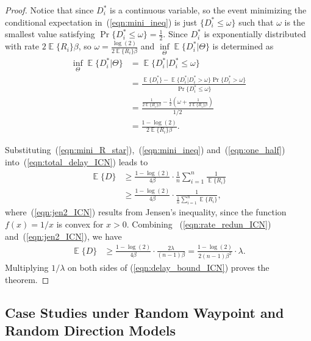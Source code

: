 \documentclass[twocolumn, 10pt]{svjour3}         \smartqed  \usepackage{graphicx}
\DeclareMathOperator*{\E}{\mathbb{E}}
\begin{document}
\begin{proof}
Notice that since $D_i^*$ is a continuous variable, so the event minimizing the conditional expectation in~(\ref{eqn:mini_ineq}) is just  $\{ D_i^* \leq \omega \}$ such that $\omega$ is the  smallest value satisfying  $\Pr\{ D_i^* \leq \omega \} = \frac{1}{2}$.
Since $D_i^*$  is exponentially distributed with rate $2 \E\{R_i\} \beta$, so  $\omega = \frac{\log (2)}{2 \E\{R_i\} \beta}$ and $\underset{\Theta}{\inf}  \E\{D_i^* | \Theta \}$ is determined as 
\begin{align}
	\underset{\Theta}{\inf}  \E\{D_i^* | \Theta \} &= \E\{D_i^* | D_i^* \leq \omega \}\nonumber\\
	&= \frac{\E\{D_i^*\} -\E\{D_i^* | D_i^* > \omega \}\Pr\{ D_i^* > \omega \} }{\Pr\{ D_i^* \leq \omega \}}\nonumber\\
	&=\frac{\frac{1}{2 \E\{R_i\} \beta} - \frac{1}{2}(\omega + \frac{1}{2 \E\{R_i\} \beta})}{1/2}\nonumber\\
	&= \frac{1-\log (2)}{{2 \E\{R_i\} \beta}}.\label{eqn:mini_R_star}
\end{align}











Substituting~(\ref{eqn:mini_R_star}),~(\ref{eqn:mini_ineq}) and~(\ref{eqn:one_half})  into~(\ref{eqn:total_delay_ICN}) leads to
\begin{align}
	\E\{D\} &\geq \frac{1- \log(2)}{4 \beta} \cdot \frac{1}{n} \sum_{i=1}^{n}  \frac{1}{\E\{ R_i \}}\label{eqn:jen1_ICN}\\
	&\geq  \frac{1- \log(2)}{4 \beta} \cdot \frac{1}{\frac{1}{n} \sum_{i=1}^{n}   {\E\{ R_i \}}},\label{eqn:jen2_ICN}
\end{align}
where~(\ref{eqn:jen2_ICN}) results  from Jensen's inequality, since the function $f(x) = 1/x$ is convex for $x>0$.
Combining ~(\ref{eqn:rate_redun_ICN}) and~(\ref{eqn:jen2_ICN}), we have
\begin{align}
	\E\{D\} &\geq    \frac{1- \log(2)}{4 \beta} \cdot \frac{2 \lambda}{(n-1)\beta} =\frac{1- \log(2) }{2 (n-1) \beta^2} \cdot \lambda .\label{eqn:delay_bound_ICN}
\end{align}
Multiplying $1/\lambda$ on both sides of (\ref{eqn:delay_bound_ICN}) proves the theorem.
\end{proof}

\subsection{Case Studies under Random Waypoint and Random Direction Models}
\end{document}
